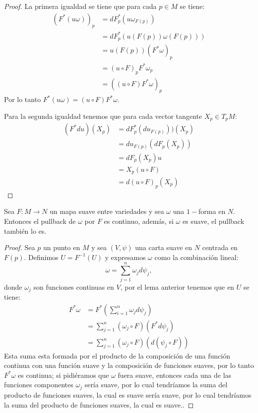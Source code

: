 \begin{proof}
	La primera igualdad se tiene que para cada $p \in M$ se tiene:
	\begin{align*}
		(F^{*}(u\omega))_p & = dF^{*}_{p} (u \omega_{F(p)})    \\
		                   & = dF^*_p ( u(F(p)) \omega(F(p)) ) \\
		                   & = u (F(p)) (F^{*}\omega)_p        \\
		                   & = (u \circ F)_{p} F^{*}\omega_p   \\
		                   & = ((u \circ F) F^*\omega)_p
	\end{align*}
	Por lo tanto $ F^{*}(u \omega) = (u \circ F) F^*\omega $.

	Para la segunda igualdad tenemos que para cada vector tangente $X_p \in T_{p}M$:
	\begin{align*}
		(F^{*}du)(X_p) & = dF_{p}^{*} (du_{F(p)}))(X_p) \\
		               & = du_{F(p)} (dF_{p}(X_p))      \\
		               & = dF_p (X_p)u                  \\
		               & = X_p (u \circ F)              \\
		               & = d(u \circ F)_p (X_p)
	\end{align*}
\end{proof}

\begin{theorem}
	Sea $F: M \to N$ un mapa suave entre variedades y sea $\omega$ una $1-$forma en $N$. Entonces el pullback de $\omega$ por $F$ es continuo, además, si $\omega$ es suave, el pullback también lo es.
\end{theorem}

\begin{proof}
	Sea $p$ un punto en $M$ y sea $(V, \psi)$ una carta suave en $N$ centrada en $F(p)$. Definimos $U = F^{-1}(U)$ y expresamos $\omega$ como la combinación lineal:
	\[
		\omega = \sum_{j=1}^{n} \omega_j d\psi_j,
	\]
	donde $\omega_j$ son funciones continuas en $V$, por el lema anterior tenemos que en $U$ se tiene:
	\begin{align*}
		F^{*} \omega & = F^{*} \left( \sum_{i=1}^{n} \omega_j d\psi_j \right) \\
		             & = \sum_{j=1}^{n} (\omega_j \circ F)(F^{*} d\psi_j)     \\
		             & = \sum_{j=1}^{n} (\omega_j \circ F)(d(\psi_j \circ F))
	\end{align*}
  Esta suma esta formada por el producto de la composición de una función continua con una función suave y la composición de funciones suaves, por lo tanto $F^{*}\omega$ es continua; si pidiéramos que $\omega$ fuera suave, entonces cada una de las funciones componentes $\omega_j$ sería suave, por lo cual tendríamos la suma del producto de funciones suaves, la cual es suave sería suave, por lo cual tendríamos la suma del producto de funciones suaves, la cual es suave..
\end{proof}
